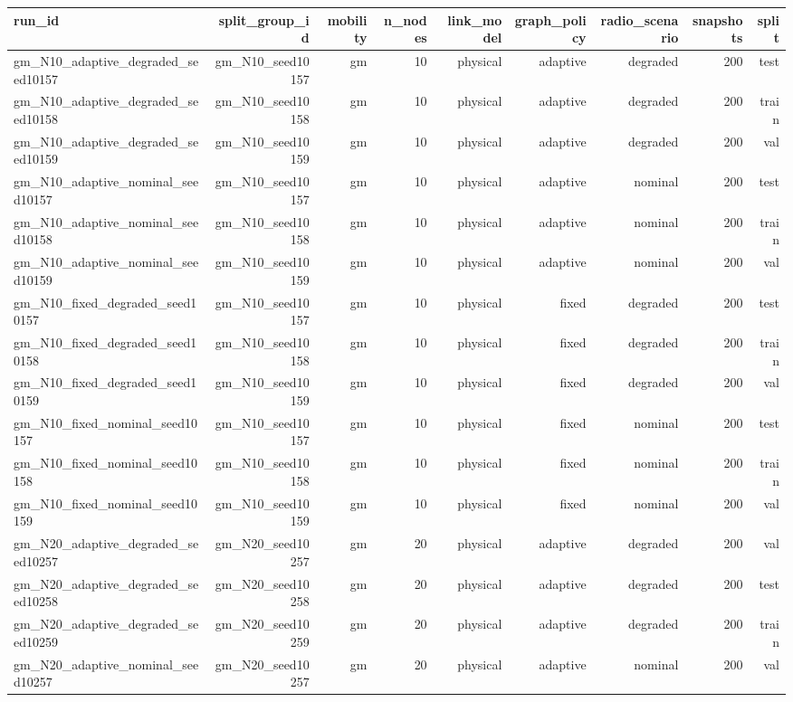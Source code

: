 \begin{tabular}{lrrrrrrrr}
\toprule
run\_id & split\_group\_id & mobility & n\_nodes & link\_model & graph\_policy & radio\_scenario & snapshots & split \\
\midrule
gm\_N10\_adaptive\_degraded\_seed10157 & gm\_N10\_seed10157 & gm & 10 & physical & adaptive & degraded & 200 & test \\
gm\_N10\_adaptive\_degraded\_seed10158 & gm\_N10\_seed10158 & gm & 10 & physical & adaptive & degraded & 200 & train \\
gm\_N10\_adaptive\_degraded\_seed10159 & gm\_N10\_seed10159 & gm & 10 & physical & adaptive & degraded & 200 & val \\
gm\_N10\_adaptive\_nominal\_seed10157 & gm\_N10\_seed10157 & gm & 10 & physical & adaptive & nominal & 200 & test \\
gm\_N10\_adaptive\_nominal\_seed10158 & gm\_N10\_seed10158 & gm & 10 & physical & adaptive & nominal & 200 & train \\
gm\_N10\_adaptive\_nominal\_seed10159 & gm\_N10\_seed10159 & gm & 10 & physical & adaptive & nominal & 200 & val \\
gm\_N10\_fixed\_degraded\_seed10157 & gm\_N10\_seed10157 & gm & 10 & physical & fixed & degraded & 200 & test \\
gm\_N10\_fixed\_degraded\_seed10158 & gm\_N10\_seed10158 & gm & 10 & physical & fixed & degraded & 200 & train \\
gm\_N10\_fixed\_degraded\_seed10159 & gm\_N10\_seed10159 & gm & 10 & physical & fixed & degraded & 200 & val \\
gm\_N10\_fixed\_nominal\_seed10157 & gm\_N10\_seed10157 & gm & 10 & physical & fixed & nominal & 200 & test \\
gm\_N10\_fixed\_nominal\_seed10158 & gm\_N10\_seed10158 & gm & 10 & physical & fixed & nominal & 200 & train \\
gm\_N10\_fixed\_nominal\_seed10159 & gm\_N10\_seed10159 & gm & 10 & physical & fixed & nominal & 200 & val \\
gm\_N20\_adaptive\_degraded\_seed10257 & gm\_N20\_seed10257 & gm & 20 & physical & adaptive & degraded & 200 & val \\
gm\_N20\_adaptive\_degraded\_seed10258 & gm\_N20\_seed10258 & gm & 20 & physical & adaptive & degraded & 200 & test \\
gm\_N20\_adaptive\_degraded\_seed10259 & gm\_N20\_seed10259 & gm & 20 & physical & adaptive & degraded & 200 & train \\
gm\_N20\_adaptive\_nominal\_seed10257 & gm\_N20\_seed10257 & gm & 20 & physical & adaptive & nominal & 200 & val \\

\end{tabular}
